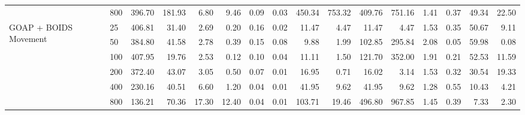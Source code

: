 \begin{table}[htbp]
\begin{tabular}{llrrrrrrrrrrrrrr}
 & 800 & 396.70 & 181.93 & 6.80 & 9.46 & 0.09 & 0.03 & 450.34 & 753.32 & 409.76 & 751.16 & 1.41 & 0.37 & 49.34 & 22.50 \\
\cline{1-16}
\multirow[t]{6}{*}{GOAP + BOIDS Movement} & 25 & 406.81 & 31.40 & 2.69 & 0.20 & 0.16 & 0.02 & 11.47 & 4.47 & 11.47 & 4.47 & 1.53 & 0.35 & 50.67 & 9.11 \\
 & 50 & 384.80 & 41.58 & 2.78 & 0.39 & 0.15 & 0.08 & 9.88 & 1.99 & 102.85 & 295.84 & 2.08 & 0.05 & 59.98 & 0.08 \\
 & 100 & 407.95 & 19.76 & 2.53 & 0.12 & 0.10 & 0.04 & 11.11 & 1.50 & 121.70 & 352.00 & 1.91 & 0.21 & 52.53 & 11.59 \\
 & 200 & 372.40 & 43.07 & 3.05 & 0.50 & 0.07 & 0.01 & 16.95 & 0.71 & 16.02 & 3.14 & 1.53 & 0.32 & 30.54 & 19.33 \\
 & 400 & 230.16 & 40.51 & 6.60 & 1.20 & 0.04 & 0.01 & 41.95 & 9.62 & 41.95 & 9.62 & 1.28 & 0.55 & 10.43 & 4.21 \\
 & 800 & 136.21 & 70.36 & 17.30 & 12.40 & 0.04 & 0.01 & 103.71 & 19.46 & 496.80 & 967.85 & 1.45 & 0.39 & 7.33 & 2.30 \\
\cline{1-16}
\bottomrule
\end{tabular}
\end{table}
